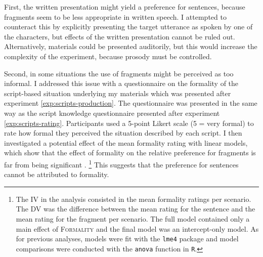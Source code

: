 First, the written presentation might yield a preference for sentences, because fragments seem to be less appropriate in written speech. I attempted to counteract this by explicitly presenting the target utterance as spoken by one of the characters, but effects of the written presentation cannot be ruled out. Alternatively, materials could be presented auditorily, but this would increase the complexity of the experiment, because prosody must be controlled.

Second, in some situations the use of fragments might be perceived as too informal. I addressed this issue with a questionnaire on the formality of the script-based situation underlying my materials which was presented after experiment \ref{exp:scripts-production}. The questionnaire was presented in the same way as the script knowledge questionnaire presented after experiment \ref{exp:scripts-rating}. Participants used a 5-point Likert scale (5 = very formal) to rate how formal they perceived the situation described by each script. I then investigated a potential effect of the mean formality rating with linear models, which show that the effect of formality on the relative preference for fragments is far from being significant .%
%
\footnote{The IV in the analysis consisted in the mean formality ratings per scenario. The DV was the difference between the mean rating for the sentence and the mean rating for the fragment per scenario. The full model contained only a main effect of \textsc{Formality} and the final model was an intercept-only model. As for previous analyses, models were fit with the \texttt{lme4} package \citep{bates.etal2015} and model comparisons were conducted with the \texttt{anova} function in \texttt{R}.}\afterfn%
%
This suggests that the preference for sentences cannot be attributed to formality.

